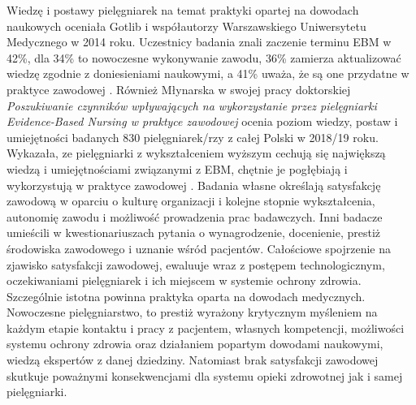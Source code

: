 \documentclass[a4paper,12pt,twoside,openright]{mwrep}
\begin{document}
 Wiedzę i postawy pielęgniarek na temat praktyki opartej na dowodach naukowych oceniała Gotlib i współautorzy Warszawskiego Uniwersytetu Medycznego w 2014 roku. Uczestnicy badania znali zaczenie terminu EBM w 42\%, dla 34\% to nowoczesne wykonywanie zawodu, 36\% zamierza aktualizować wiedzę zgodnie z doniesieniami naukowymi, a 41\% uważa, że są one przydatne w praktyce zawodowej \cite{gotlib}.  Również Młynarska w swojej pracy doktorskiej \textit{ Poszukiwanie czynników wpływających na wykorzystanie przez pielęgniarki Evidence-Based Nursing w praktyce zawodowej} ocenia poziom wiedzy, postaw i umiejętności badanych 830 pielęgniarek/rzy z całej Polski  w 2018/19 roku. Wykazała, ze pielęgniarki z wykształceniem wyższym cechują się największą wiedzą i umiejętnościami związanymi z EBM, chętnie je  pogłębiają i wykorzystują w praktyce zawodowej \cite{EBM}. Badania własne określają satysfakcję zawodową w oparciu o kulturę organizacji i kolejne stopnie wykształcenia, autonomię zawodu i możliwość prowadzenia prac badawczych. Inni badacze umieścili w kwestionariuszach pytania o wynagrodzenie, docenienie, prestiż środowiska zawodowego i uznanie wśród pacjentów. Całościowe spojrzenie na zjawisko satysfakcji zawodowej, ewaluuje wraz z postępem technologicznym, oczekiwaniami pielęgniarek i ich miejscem w systemie ochrony zdrowia. Szczególnie istotna powinna praktyka oparta na dowodach medycznych. Nowoczesne pielęgniarstwo, to prestiż wyrażony krytycznym myśleniem na każdym etapie kontaktu i pracy z pacjentem, własnych kompetencji, możliwości systemu ochrony zdrowia oraz działaniem popartym dowodami naukowymi, wiedzą ekspertów z danej dziedziny. Natomiast brak satysfakcji zawodowej skutkuje poważnymi konsekwencjami dla systemu opieki zdrowotnej jak i samej pielęgniarki.
\end{document}
